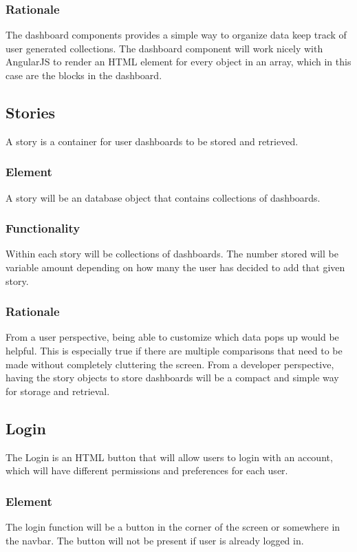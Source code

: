 \documentclass[journal,10pt,onecolumn,compsoc]{IEEEtran}
\begin{document}
    \subsubsection{Rationale} 
    The dashboard components provides a simple way to organize data keep track of user generated collections. The dashboard component will work nicely with AngularJS to render an HTML element for every object in an array, which in this case are the blocks in the dashboard.
    
    \subsection{Stories}
    A story is a container for user dashboards to be stored and retrieved.
    \subsubsection{Element}
    A story will be an database object that contains collections of dashboards.
    \subsubsection{Functionality}
    Within each story will be collections of dashboards. The number stored will be variable amount depending on how many the user has decided to add that given story.
    \subsubsection{Rationale}
    From a user perspective, being able to customize which data pops up would be helpful. This is especially true if there are multiple comparisons that need to be made without completely cluttering the screen. From a developer perspective, having the story objects to store dashboards will be a compact and simple way for storage and retrieval.
    
    \subsection{Login}
	The Login is an HTML button that will allow users to login with an account, which will have different permissions and preferences for each user.
	\subsubsection{Element}
	The login function will be a button in the corner of the screen or somewhere in the navbar. The button will not be present if user is already logged in.
\end{document}
